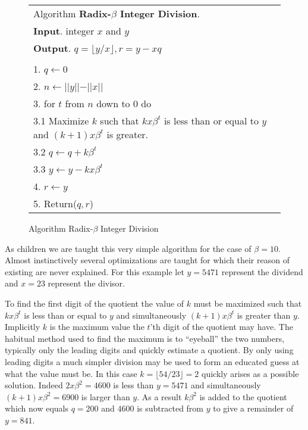 \documentclass[b5paper]{book}
\begin{document}
\newpage\begin{figure}[!here]
\begin{small}
\begin{center}
\begin{tabular}{l}
\hline Algorithm \textbf{Radix-$\beta$ Integer Division}. \\
\textbf{Input}.   integer $x$ and $y$ \\
\textbf{Output}.  $q = \lfloor y/x\rfloor, r = y - xq$ \\
\hline \\
1.  $q \leftarrow 0$ \\
2.  $n \leftarrow \vert \vert y \vert \vert - \vert \vert x \vert \vert$ \\
3.  for $t$ from $n$ down to $0$ do \\
\hspace{3mm}3.1  Maximize $k$ such that $kx\beta^t$ is less than or equal to $y$ and $(k + 1)x\beta^t$ is greater. \\
\hspace{3mm}3.2  $q \leftarrow q + k\beta^t$ \\
\hspace{3mm}3.3  $y \leftarrow y - kx\beta^t$ \\
4.  $r \leftarrow y$ \\
5.  Return($q, r$) \\
\hline
\end{tabular}
\end{center}
\end{small}
\caption{Algorithm Radix-$\beta$ Integer Division}
\label{fig:raddiv}
\end{figure}

As children we are taught this very simple algorithm for the case of $\beta = 10$.  Almost instinctively several optimizations are taught for which
their reason of existing are never explained.  For this example let $y = 5471$ represent the dividend and $x = 23$ represent the divisor.

To find the first digit of the quotient the value of $k$ must be maximized such that $kx\beta^t$ is less than or equal to $y$ and 
simultaneously $(k + 1)x\beta^t$ is greater than $y$.  Implicitly $k$ is the maximum value the $t$'th digit of the quotient may have.  The habitual method
used to find the maximum is to ``eyeball'' the two numbers, typically only the leading digits and quickly estimate a quotient.  By only using leading
digits a much simpler division may be used to form an educated guess at what the value must be.  In this case $k = \lfloor 54/23\rfloor = 2$ quickly 
arises as a possible  solution.  Indeed $2x\beta^2 = 4600$ is less than $y = 5471$ and simultaneously $(k + 1)x\beta^2 = 6900$ is larger than $y$.  
As a  result $k\beta^2$ is added to the quotient which now equals $q = 200$ and $4600$ is subtracted from $y$ to give a remainder of $y = 841$.
\end{document}
